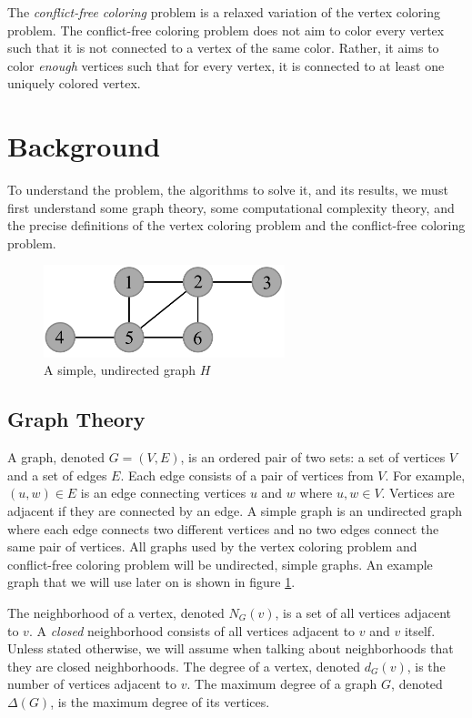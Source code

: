 \documentclass{sig-alternate}
\begin{document}
The \emph{conflict-free coloring} problem is a relaxed variation of the vertex coloring problem. The conflict-free coloring problem does not aim to color every vertex such that it is not connected to a vertex of the same color. Rather, it aims to color \emph{enough} vertices such that for every vertex, it is connected to at least one uniquely colored vertex.


\section{Background}
\label{sec:background}
To understand the problem, the algorithms to solve it, and its results, we must first understand some graph theory, some computational complexity theory, and the precise definitions of the vertex coloring problem and the conflict-free coloring problem.

\begin{figure}[h]
	\centering
	\includegraphics[width=7cm]{../figures/example.pdf}
	\caption{A simple, undirected graph $H$}\label{fig:graph}
\end{figure}

\subsection{Graph Theory}
\label{sec:graphtheory}

A graph, denoted $G=(V,E)$, is an ordered pair of two sets: a set of vertices $V$ and a set of edges $E$. Each edge consists of a pair of vertices from $V$. For example, $(u,w) \in E$ is an edge connecting vertices $u$ and $w$ where $u,w \in V$. Vertices are adjacent if they are connected by an edge. A simple graph is an undirected graph where each edge connects two different vertices and no two edges connect the same pair of vertices. All graphs used by the vertex coloring problem and conflict-free coloring problem will be undirected, simple graphs. An example graph that we will use later on is shown in figure \ref{fig:graph}.

The neighborhood of a vertex, denoted $N_G(v)$, is a set of all vertices adjacent to $v$. A \emph{closed} neighborhood consists of all vertices adjacent to $v$ and $v$ itself. Unless stated otherwise, we will assume when talking about neighborhoods that they are closed neighborhoods. The degree of a vertex, denoted $d_G(v)$, is the number of vertices adjacent to $v$. The maximum degree of a graph $G$, denoted $\Delta(G)$, is the maximum degree of its vertices. \cite{bondy1976graph}
\end{document}
